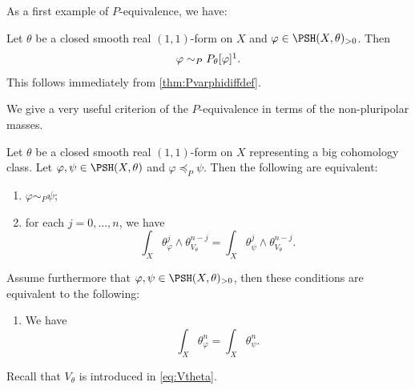 As a first example of $P$-equivalence, we have:
\begin{example}\label{ex:Pequiv}
    Let $\theta$ be a closed smooth real $(1,1)$-form on $X$ and $\varphi\in \PSH(X,\theta)_{>0}$. Then
    \[
        \varphi\sim_P P_{\theta}[\varphi]\footnotemark.
    \]
    This follows immediately from \cref{thm:Pvarphidiffdef}.
\end{example}

We give a very useful criterion of the $P$-equivalence in terms of the non-pluripolar masses.
\begin{proposition}\label{prop:Pequivchar2}
    Let $\theta$ be a closed smooth real $(1,1)$-form on $X$ representing a big cohomology class.
    Let $\varphi,\psi\in \PSH(X,\theta)$ and $\varphi\preceq_P \psi$. Then the following are equivalent:
    \begin{enumerate}
        \item\label{itm:prop:Pequivchar2:1} $\varphi\sim_P \psi$;
        \item\label{itm:prop:Pequivchar2:2} for each $j=0,\ldots,n$, we have
            \begin{equation}\label{eq:mixedmassequal}
                \int_X \theta_{\varphi}^j\wedge \theta_{V_{\theta}}^{n-j}=\int_X \theta_{\psi}^j\wedge \theta_{V_{\theta}}^{n-j}.
            \end{equation}
    \end{enumerate}
    Assume furthermore that $\varphi,\psi\in \PSH(X,\theta)_{>0}$, then these conditions are equivalent to the following:
    \begin{enumerate}[resume]
        \item\label{itm:prop:Pequivchar2:3} We have
            \[
                \int_X \theta_{\varphi}^n=\int_X \theta_{\psi}^n.
            \]
    \end{enumerate}
\end{proposition}
Recall that $V_{\theta}$ is introduced in \eqref{eq:Vtheta}.

